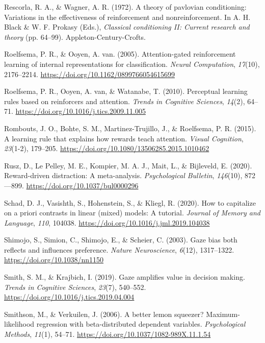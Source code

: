\documentclass[
  man,
  floatsintext,
  longtable,
  nolmodern,
  notxfonts,
  notimes,
  mask,
  colorlinks=true,linkcolor=blue,citecolor=blue,urlcolor=blue]{apa7}
\newlength{\cslhangindent}
\newenvironment{CSLReferences}[2] %
 {\begin{list}{}{%
  \setlength{\itemindent}{0pt}
  \setlength{\leftmargin}{0pt}
  \setlength{\parsep}{0pt}
  \ifodd #1
   \setlength{\leftmargin}{\cslhangindent}
   \setlength{\itemindent}{-1\cslhangindent}
  \fi
  \setlength{\itemsep}{#2\baselineskip}}}
 {\end{list}}
\begin{document}
\begin{CSLReferences}{1}{0}
Rescorla, R. A., \& Wagner, A. R. (1972). A theory of pavlovian
conditioning: Variations in the effectiveness of reinforcement and
nonreinforcement. In A. H. Black \& W. F. Prokasy (Eds.),
\emph{Classical conditioning II: Current research and theory} (pp.
64--99). Appleton-Century-Crofts.

Roelfsema, P. R., \& Ooyen, A. van. (2005). Attention-gated
reinforcement learning of internal representations for classification.
\emph{Neural Computation}, \emph{17}(10), 2176--2214.
\url{https://doi.org/10.1162/0899766054615699}

Roelfsema, P. R., Ooyen, A. van, \& Watanabe, T. (2010). Perceptual
learning rules based on reinforcers and attention. \emph{Trends in
Cognitive Sciences}, \emph{14}(2), 64--71.
\url{https://doi.org/10.1016/j.tics.2009.11.005}

Rombouts, J. O., Bohte, S. M., Martinez-Trujillo, J., \& Roelfsema, P.
R. (2015). A learning rule that explains how rewards teach attention.
\emph{Visual Cognition}, \emph{23}(1-2), 179--205.
\url{https://doi.org/10.1080/13506285.2015.1010462}

Rusz, D., Le Pelley, M. E., Kompier, M. A. J., Mait, L., \& Bijleveld,
E. (2020). Reward-driven distraction: A meta-analysis.
\emph{Psychological Bulletin}, \emph{146}(10), 872---899.
\url{https://doi.org/10.1037/bul0000296}

Schad, D. J., Vasishth, S., Hohenstein, S., \& Kliegl, R. (2020). How to
capitalize on a priori contrasts in linear (mixed) models: A tutorial.
\emph{Journal of Memory and Language}, \emph{110}, 104038.
\url{https://doi.org/10.1016/j.jml.2019.104038}

Shimojo, S., Simion, C., Shimojo, E., \& Scheier, C. (2003). Gaze bias
both reflects and influences preference. \emph{Nature Neuroscience},
\emph{6}(12), 1317--1322. \url{https://doi.org/10.1038/nn1150}

Smith, S. M., \& Krajbich, I. (2019). Gaze amplifies value in decision
making. \emph{Trends in Cognitive Sciences}, \emph{23}(7), 540--552.
\url{https://doi.org/10.1016/j.tics.2019.04.004}

Smithson, M., \& Verkuilen, J. (2006). A better lemon squeezer?
Maximum-likelihood regression with beta-distributed dependent variables.
\emph{Psychological Methods}, \emph{11}(1), 54--71.
\url{https://doi.org/10.1037/1082-989X.11.1.54}


\end{CSLReferences}
\end{document}
